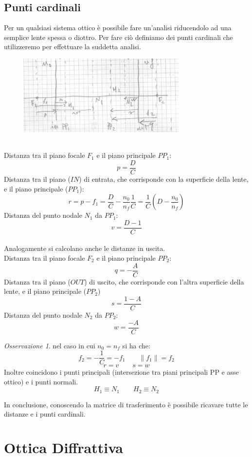 \documentclass{article}
\theoremstyle{remark}
\newtheorem*{remark}{Osservazione}
\begin{document}
\subsection*{Punti cardinali}
Per un qualsiasi sistema ottico è possibile fare un'analisi riducendolo ad una semplice lente spessa o diottro. Per fare ciò definiamo dei punti cardinali che utilizzeremo per effettuare la suddetta analisi.\\
\begin{figure}[h]
\centering
\includegraphics[height=4cm]{images/lente_spessa}
\end{figure}
\\
Distanza tra il piano focale $F_1$ e il piano principale $PP_1$:
\begin{equation*}
p = \frac{D}{C}
\end{equation*}
Distanza tra il piano ($IN$) di entrata, che corrisponde con la superficie della lente, e il piano principale ($PP_1$):
\begin{equation*}
r = p - f_1 = \frac{D}{C} - \frac{n_0}{n_f} \frac{1}{C} = \frac{1}{C} \left(D - \frac{n_0}{n_f} \right)
\end{equation*}
Distanza del punto nodale $N_1$ da $PP_1$:
\begin{equation*}
v = \frac{D-1}{C}
\end{equation*}
\\
Analogamente si calcolano anche le distanze in uscita.\\
Distanza tra il piano focale $F_2$ e il piano principale $PP_2$:
\begin{equation*}
q = - \frac{A}{C}
\end{equation*}
Distanza tra il piano ($OUT$) di uscito, che corrisponde con l'altra superficie della lente, e il piano principale ($PP_2$)
\begin{equation*}
s = \frac{1-A}{C}
\end{equation*}
Distanza del punto nodale $N_2$ da $PP_2$:
\begin{equation*}
w = \frac{-A}{C}
\end{equation*}
\begin{remark}
nel caso in cui $n_0 = n_f$ si ha che:
\begin{equation*}
f_2 = - \frac{1}{C} = - f_1 \qquad \|f_1\| = f_2
\end{equation*}
\begin{equation*}
r = v \qquad s = w
\end{equation*}
Inoltre coincidono i punti principali (intersezione tra piani principali PP e asse ottico) e i punti normali.
\begin{equation*}
H_1 \equiv N_1 \qquad H_2 \equiv N_2
\end{equation*}
\end{remark}
In conclusione, conoscendo la matrice di trasferimento è possibile ricavare tutte le distanze e i punti cardinali.
\newpage

\section*{Ottica Diffrattiva}
\end{document}
